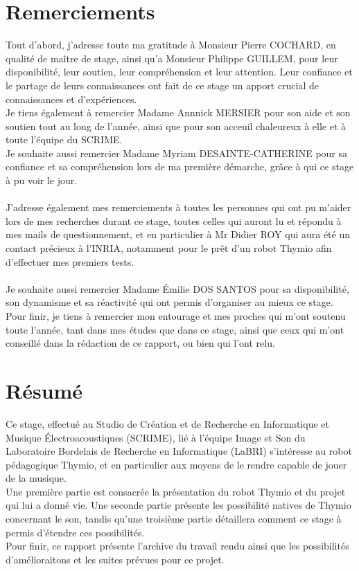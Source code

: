 \documentclass[a4paper, 12pt]{report}
\begin{document}


\chapter*{Remerciements}

Tout d'abord, j'adresse toute ma gratitude à Monsieur Pierre COCHARD, en qualité de maître de stage, ainsi qu'a Monsieur Philippe GUILLEM, pour leur disponibilité, leur soutien, leur compréhension et leur attention. Leur confiance et le partage de leurs connaissances ont fait de ce stage un apport crucial de connaissances et d'expériences.\\

Je tiens également à remercier Madame Annnick MERSIER pour son aide et son soutien tout au long de l'année, ainsi que pour son acceuil chaleureux à elle et à toute l'équipe du SCRIME.\\
Je souhaite aussi remercier Madame Myriam DESAINTE-CATHERINE pour sa confiance et sa compréhension lors de ma première démarche, grâce à qui ce stage à pu voir le jour.\\\\
J'adresse également mes remerciements à toutes les personnes qui ont pu m'aider lors de mes recherches durant ce stage, toutes celles qui auront lu et répondu à mes mails de questionnement, et en particulier à Mr Didier ROY qui aura été un contact précieux à l'INRIA, notamment pour le prêt d'un robot Thymio afin d'effectuer mes premiers tests.\\\\
Je souhaite aussi remercier Madame Émilie DOS SANTOS pour sa disponibilité, son dynamisme et sa réactivité qui ont permis d'organiser au mieux ce stage.\\

Pour finir, je tiens à remercier mon entourage et mes proches qui m'ont soutenu toute l'année, tant dans mes études que dans ce stage, ainsi que ceux qui m'ont conseillé dans la rédaction de ce rapport, ou bien qui l'ont relu.

\chapter*{Résumé}
	Ce stage, effectué au Studio de Création et de Recherche en Informatique et Musique Électroacoustiques (SCRIME), lié à l'équipe Image et Son du Laboratoire Bordelais de Recherche en Informatique (LaBRI) s'intéresse au robot pédagogique Thymio, et en particulier aux moyens de le rendre capable de jouer de la musique.\\
Une première partie est consacrée la présentation du robot Thymio et du projet qui lui a donné vie. Une seconde partie présente les possibilité natives de Thymio concernant le son, tandis qu'une troisième partie détaillera comment ce stage à permis d'étendre ces possibilités.\\
Pour finir, ce rapport présente l'archive du travail rendu ainsi que les possibilités d'amélioraitons et les suites prévues pour ce projet.
\end{document}
